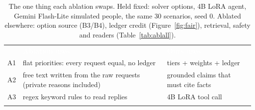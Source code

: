 \documentclass[10pt,a4paper]{article}
\newcommand{\hdr}{\rowcolor{secblue}}
\newcommand{\hd}[1]{\textcolor{white}{\textbf{#1}}}
\begin{document}
\begin{table}[H]
\centering\footnotesize
\setlength{\tabcolsep}{4pt}
\begin{tabular}{l l l}
\arrayrulecolor{secblue}\toprule\arrayrulecolor{black}
\hdr & \hd{Ablation uses} & \hd{Ours uses}\\
\arrayrulecolor{secblue}\midrule\arrayrulecolor{black}
A1 & flat priorities: every request equal, no ledger & tiers + weights + ledger\\
A2 & free text written from the raw requests (private reasons included) & grounded claims that must cite facts\\
A3 & regex keyword rules to read replies & 4B LoRA tool call\\
\arrayrulecolor{secblue}\bottomrule\arrayrulecolor{black}
\end{tabular}
\caption{The one thing each ablation swaps. Held fixed: solver options, 4B LoRA agent, Gemini
Flash-Lite simulated people, the same 30 scenarios, seed 0. Ablated elsewhere: option source (B3/B4),
ledger credit (Figure~\ref{fig:fair}), retrieval, safety and readers (Table~\ref{tab:ablall}).}
\label{tab:ablsetup}
\end{table}
\end{document}
